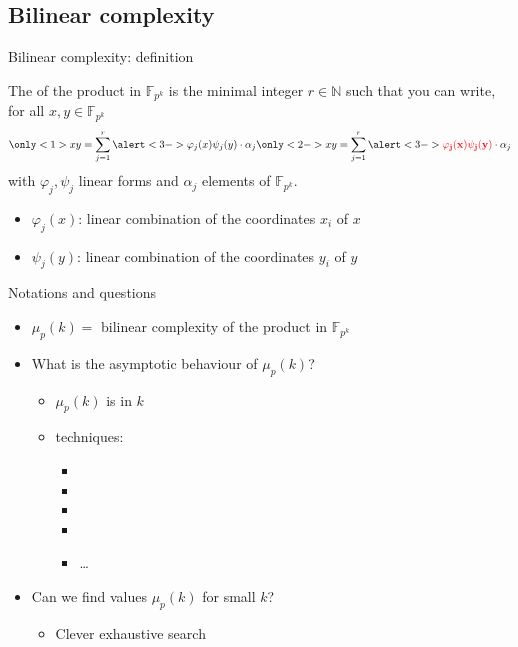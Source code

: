 \documentclass[xcolor=x11names,compress, aspectratio=43]{beamer}
\begin{document}
\subsection{Bilinear complexity}
\begin{frame}{Bilinear complexity: definition}
  \begin{defi}
    The  of the product in $\mathbb{F}_{p^k}$ is the minimal integer
    $r\in\mathbb{N}$ such that you can write, for all $x,
    y\in\mathbb{F}_{p^k}$
    \[
      \only<1>{xy = \sum_{j=1}^r \alert<3->{\varphi_j(x)\psi_j(y)}\cdot\alpha_j}
      \only<2->{xy = \sum_{j=1}^r
      \alert<3->{\frb{\varphi_j(x)}\frb{\psi_j(y)}}\cdot\alpha_j}
    \]
    with $\varphi_j, \psi_j$ linear forms and $\alpha_j$ elements of
    $\mathbb{F}_{p^k}$.
  \end{defi}
  \begin{itemize}
    \item<2-> $\varphi_j(x)$: linear combination of the coordinates $x_i$ of $x$
    \item<2-> $\psi_j(y)$: linear combination of the coordinates $y_i$ of $y$
  \end{itemize}
\end{frame}

\begin{frame}{Notations and questions}
  \begin{itemize}
    \item $\mu_p(k) = $ bilinear complexity of the product in $\mathbb{F}_{p^k}$
  \end{itemize}

  \begin{itemize}
    \item What is the asymptotic behaviour of $\mu_p(k)$?
      \begin{itemize}
        \item<2-> $\mu_p(k)$ is  in $k$
        \item<3->  techniques:
          \begin{itemize}
            \item<4-> 
            \item<4-> 
            \item<4-> 
            \item<4-> 
            \item<4-> \dots
          \end{itemize}
      \end{itemize}
    \item Can we find values $\mu_p(k)$ for small $k$?
      \begin{itemize}
        \item<5-> Clever exhaustive search~~
      \end{itemize}
  \end{itemize}
\end{frame}
\end{document}
